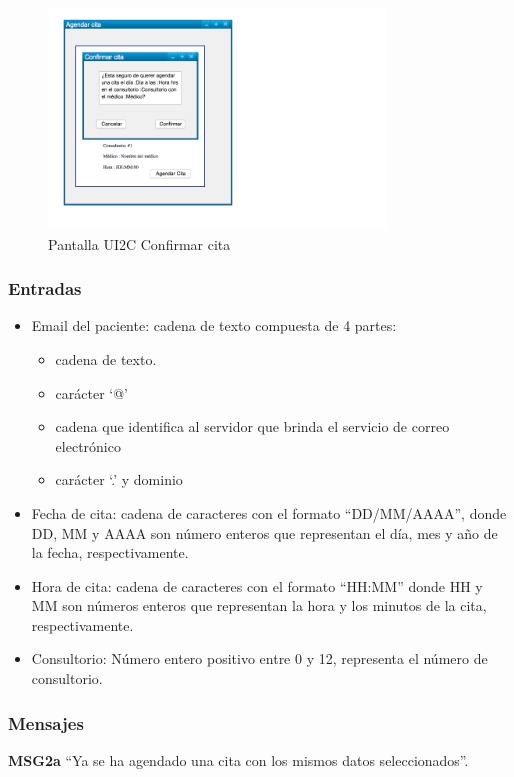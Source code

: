 \begin{figure}[htbp!]
    \centering
        \includegraphics[width=0.8\textwidth]{images/UI2C}
    \caption{Pantalla UI2C Confirmar cita}
\end{figure}
\subsubsection{Entradas}
    \begin{itemize}
        \item Email del paciente: cadena de texto compuesta de 4 partes:  
            \begin{itemize}
                \item cadena de texto.
                \item carácter ‘@’
                \item cadena que identifica al servidor que brinda el servicio de correo electrónico
                \item carácter ‘.’ y dominio
            \end{itemize}
        \item Fecha de cita: cadena de caracteres con el formato ``DD/MM/AAAA'', donde DD, MM y AAAA son número enteros que representan el día, mes y año de la fecha, respectivamente.
        \item Hora de cita: cadena de caracteres con el formato ``HH:MM'' donde HH y MM son números enteros que representan la hora y los minutos de la cita, respectivamente.
        \item Consultorio: Número entero positivo entre 0 y 12, representa el número de consultorio.
    \end{itemize}
\subsubsection{Mensajes}
    \begin{Citemize}
        \item {\bf MSG2a} “Ya se ha agendado una cita con los mismos datos seleccionados”.
    \end{Citemize}

